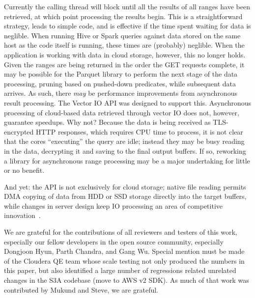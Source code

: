 \documentclass[manuscript]{acmart}
\begin{document}
Currently the calling thread will block until all the results of all ranges have
been retrieved, at which point processing the results begin.
This is a straightforward strategy, leads to simple code, and is effective
if the time spent waiting for data is neglible.
When running Hive or Spark queries against data stored on the same host as
the code itself is running, these times are (probably) neglible.
When the application is working with data in cloud storage, however,
this no longer holds.
Given the ranges are being returned in the order the GET requests complete,
it may be possible for the Parquet library to perform the next stage
of the data processing, pruning based on pushed-down predicates, while
subsequent data arrives.
As such, there \emph{may} be performance improvements from asynchronous
result processing.
The Vector IO API was designed to support this.
Asynchronous processing of cloud-based data retrieved through vector IO does not, however, guarantee
speedups.
Why not?
Because the data is being received as TLS-encrypted HTTP responses,
which requires CPU time to process, it is not clear that the
cores ``executing'' the query are idle; instead they may be
busy reading in the data, decrypting it and saving to the final
output buffers.
If so, reworking a library for asynchronous range processing may
be a major undertaking for little or no benefit.

And yet: the API is not exclusively for cloud storage; native file
reading permits DMA copying of data from HDD or SSD storage
directly into the target buffers, while changes in
server design keep IO processing an area of
competitive innovation~\cite{10.1145/3620665.3640401}.




\begin{acks}
We are grateful for the contributions of all reviewers and testers of this work,
especially our fellow developers in the open source community,
especially Dongjoon Hyun, Parth Chandra, and Gang Wu.
Special mention must be made of the Cloudera QE team whose scale testing
not only produced the numbers in this paper, but also identified a large number
of regressions related unrelated changes in the S3A codebase (move to AWS v2 SDK).
As much of that work was contributed by Mukund and Steve, we are grateful.
\end{acks}


\end{document}
